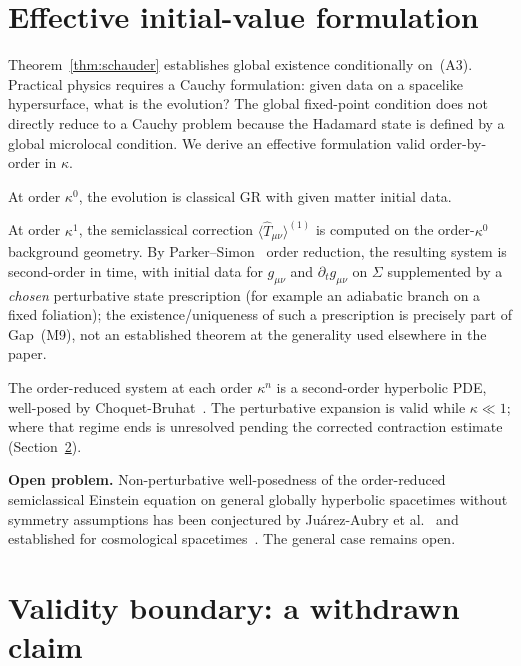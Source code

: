 \documentclass[12pt,a4paper]{article}
\begin{document}
\section{Effective initial-value formulation}
\label{sec:ivp}

Theorem~\ref{thm:schauder} establishes global existence conditionally on~(A3).
Practical physics requires a
Cauchy formulation: given data on a spacelike hypersurface, what is the evolution? The
global fixed-point condition does not directly reduce to a Cauchy problem because the
Hadamard state is defined by a global microlocal condition. We derive an effective
formulation valid order-by-order in $\kappa$.

At order $\kappa^0$, the evolution is classical GR with given matter initial data.

At order $\kappa^1$, the semiclassical correction $\langle\hat{T}_{\mu\nu}\rangle^{(1)}$
is computed on the order-$\kappa^0$ background geometry. By Parker--Simon~\cite{parker_simon}
order reduction, the resulting system is second-order in time, with initial data for
$g_{\mu\nu}$ and $\partial_t g_{\mu\nu}$ on $\Sigma$ supplemented by a \emph{chosen}
perturbative state prescription (for example an adiabatic branch on a fixed foliation);
the existence/uniqueness of such a prescription is precisely part of Gap~(M9), not an
established theorem at the generality used elsewhere in the paper.

The order-reduced system at each order $\kappa^n$ is a second-order hyperbolic PDE,
well-posed by Choquet-Bruhat~\cite{choquet_bruhat}. The perturbative expansion is valid
while $\kappa \ll 1$; where that regime ends is unresolved pending the corrected
contraction estimate (Section~\ref{sec:planck}).

\noindent\textbf{Open problem.} Non-perturbative well-posedness of the order-reduced
semiclassical Einstein equation on general globally hyperbolic spacetimes without symmetry
assumptions has been conjectured by Ju\'arez-Aubry et al.~\cite{juarez_aubry} and
established for cosmological spacetimes~\cite{pinamonti_siemssen}. The general case
remains open.

\section{Validity boundary: a withdrawn claim}
\label{sec:planck}
\end{document}
